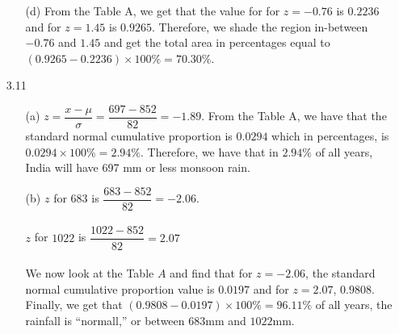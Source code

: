 \documentclass[11pt, a4paper]{article}
\begin{document}
\begin{itemize}
\begin{itemize}
\item[(d)]
From the Table A, we get that the value for for $z = -0.76$ is $0.2236$
and for $z = 1.45$ is $0.9265$. Therefore, we shade the region in-between
$-0.76$ and $1.45$ and get the total area in percentages
equal to $(0.9265 - 0.2236) \times 100\% = 70.30\%$.
\item[]
\item[]
\item[]
\end{itemize}

\item[]
\item[]

\item[3.11]
\begin{itemize}
\item[(a)]
$z = \dfrac{x - \mu}{\sigma} = \dfrac{697 - 852}{82} = -1.89$.
From the Table A, we have that the standard normal cumulative
proportion is $0.0294$ which in percentages, is $0.0294 \times 100 \% = 2.94 \%$.
Therefore, we have that in $2.94 \%$ of all years, India will have 697 mm or less monsoon rain.
\item[]

\item[(b)]
$z$ for $683$ is $\dfrac{683 - 852}{82} = -2.06$.\\\\
$z$ for $1022$ is $\dfrac{1022 - 852}{82} = 2.07$\\\\
We now look at the Table $A$ and find that for $z = -2.06$,
the standard normal cumulative proportion value is $0.0197$
and for $z = 2.07$, $0.9808$. Finally, we get that
$(0.9808 - 0.0197) \times 100 \% = 96.11 \%$ of all years,
the rainfall is ``normall,'' or between $683$mm and $1022$mm.
\end{itemize}


\end{itemize}
\end{document}
